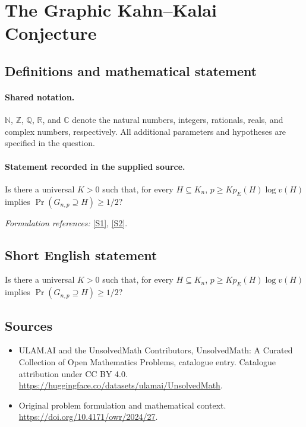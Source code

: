 \documentclass[11pt]{article}
\newcommand{\sref}[2]{\hyperlink{source:#1:#2}{[S#2]}}
\begin{document}
\section{The Graphic Kahn–Kalai Conjecture}\label{statement}

\subsection{Definitions and mathematical statement}

\paragraph{Shared notation.}$\mathbb N$, $\mathbb Z$, $\mathbb Q$, $\mathbb R$, and $\mathbb C$ denote the natural numbers, integers, rationals, reals, and complex numbers, respectively. All additional parameters and hypotheses are specified in the question.


\paragraph{Statement recorded in the supplied source.}
Is there a universal $K>0$ such that, for every $H\subseteq K_n$, $p\geq Kp_E(H)\log v(H)$ implies $\Pr(G_{n,p}\supseteq H)\geq1/2$?
\par\smallskip\textit{Formulation references:} \sref{statement}{1}, \sref{statement}{2}.
\subsection{Short English statement}
Is there a universal $K>0$ such that, for every $H\subseteq K_n$, $p\geq Kp_E(H)\log v(H)$ implies $\Pr(G_{n,p}\supseteq H)\geq1/2$?
\subsection{Sources}
\begin{itemize}
\item[\hypertarget{source:statement:1}{S1}] ULAM.AI and the UnsolvedMath Contributors, UnsolvedMath: A Curated Collection of Open Mathematics Problems, catalogue entry. Catalogue attribution under CC BY 4.0.
\url{https://huggingface.co/datasets/ulamai/UnsolvedMath}.
\item[\hypertarget{source:statement:2}{S2}] Original problem formulation and mathematical context.
\url{https://doi.org/10.4171/owr/2024/27}.
\end{itemize}
\label{end:statement}
\end{document}
